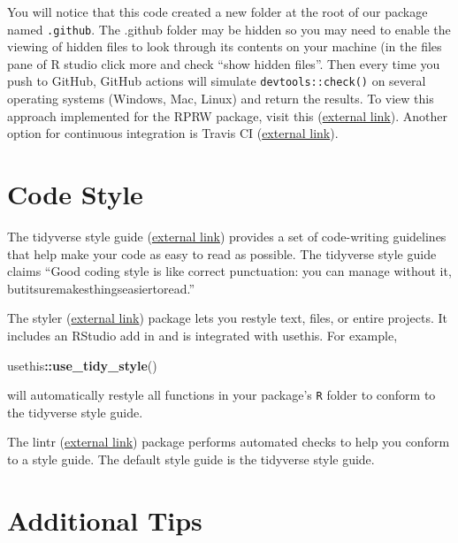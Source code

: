 \documentclass[
]{book}
\newenvironment{Shaded}{\begin{snugshade}}{\end{snugshade}}
\newcommand{\KeywordTok}[1]{\textcolor[rgb]{0.13,0.29,0.53}{\textbf{#1}}}
\newcommand{\NormalTok}[1]{#1}
\newcommand{\OperatorTok}[1]{\textcolor[rgb]{0.81,0.36,0.00}{\textbf{#1}}}
\begin{document}
You will notice that this code created a new folder at the root of our package named \texttt{.github}. The .github folder may be hidden so you may need to enable the viewing of hidden files to look through its contents on your machine (in the files pane of R studio click more and check ``show hidden files''. Then every time you push to GitHub, GitHub actions will simulate \texttt{devtools::check()} on several operating systems (Windows, Mac, Linux) and return the results. To view this approach implemented for the RPRW package, visit this (\href{https://github.com/michaeldumelle/RPRW/actions}{external link}). Another option for continuous integration is Travis CI (\href{https://travis-ci.org/}{external link}).

\hypertarget{style}{%
\section{Code Style}\label{style}}

The tidyverse style guide (\href{https://style.tidyverse.org/}{external link}) provides a set of code-writing guidelines that help make your code as easy to read as possible. The tidyverse style guide claims ``Good coding style is like correct punctuation: you can manage without it, butitsuremakesthingseasiertoread.''

The styler (\href{https://styler.r-lib.org/}{external link}) package lets you restyle text, files, or entire projects. It includes an RStudio add in and is integrated with usethis. For example,

\begin{Shaded}
\begin{Highlighting}[]
\NormalTok{usethis}\OperatorTok{::}\KeywordTok{use_tidy_style}\NormalTok{()}
\end{Highlighting}
\end{Shaded}

will automatically restyle all functions in your package's \texttt{R} folder to conform to the tidyverse style guide.

The lintr (\href{https://github.com/jimhester/lintr}{external link}) package performs automated checks to help you conform to a style guide. The default style guide is the tidyverse style guide.

\hypertarget{add-tips}{%
\section{Additional Tips}\label{add-tips}}
\end{document}
